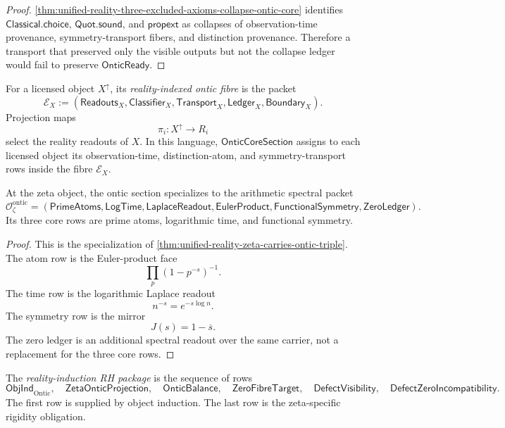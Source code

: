 \begin{proof}
\autoref{thm:unified-reality-three-excluded-axioms-collapse-ontic-core}
identifies $\mathsf{Classical.choice}$, $\mathsf{Quot.sound}$, and
$\mathsf{propext}$ as collapses of observation-time provenance,
symmetry-transport fibers, and distinction provenance.  Therefore a
transport that preserved only the visible outputs but not the collapse
ledger would fail to preserve $\mathsf{OnticReady}$.
\end{proof}

\begin{definition}
\label{def:unified-reality-reality-indexed-ontic-fibre}
For a licensed object $X^{\uparrow}$, its \emph{reality-indexed ontic
fibre} is the packet
$$
\mathcal E_X
:=
(\mathsf{Readouts}_X,\mathsf{Classifier}_X,
\mathsf{Transport}_X,\mathsf{Ledger}_X,\mathsf{Boundary}_X).
$$
Projection maps
$$
\pi_i:X^{\uparrow}\to R_i
$$
select the reality readouts of $X$.  In this language,
$\mathsf{OnticCoreSection}$ assigns to each licensed object its
observation-time, distinction-atom, and symmetry-transport rows inside
the fibre $\mathcal E_X$.
\end{definition}

\begin{theorem}
\label{thm:unified-reality-zeta-arithmetic-spectral-ontic-fibre}
At the zeta object, the ontic section specializes to the arithmetic
spectral packet
$$
\mathcal O_{\zeta}^{\mathrm{ontic}}
=
(
\mathsf{PrimeAtoms},
\mathsf{LogTime},
\mathsf{LaplaceReadout},
\mathsf{EulerProduct},
\mathsf{FunctionalSymmetry},
\mathsf{ZeroLedger}
).
$$
Its three core rows are prime atoms, logarithmic time, and functional
symmetry.
\end{theorem}

\begin{proof}
This is the specialization of
\autoref{thm:unified-reality-zeta-carries-ontic-triple}.  The atom row is
the Euler-product face
$$
\prod_p(1-p^{-s})^{-1}.
$$
The time row is the logarithmic Laplace readout
$$
n^{-s}=e^{-s\log n}.
$$
The symmetry row is the mirror
$$
J(s)=1-\overline{s}.
$$
The zero ledger is an additional spectral readout over the same carrier,
not a replacement for the three core rows.
\end{proof}

\begin{definition}
\label{def:unified-reality-reality-induction-rh-package}
The \emph{reality-induction RH package} is the sequence of rows
$$
\mathsf{ObjInd}_{\mathrm{Ontic}},
\quad
\mathsf{ZetaOnticProjection},
\quad
\mathsf{OnticBalance},
\quad
\mathsf{ZeroFibreTarget},
\quad
\mathsf{DefectVisibility},
\quad
\mathsf{DefectZeroIncompatibility}.
$$
The first row is supplied by object induction.  The last row is the
zeta-specific rigidity obligation.
\end{definition}

